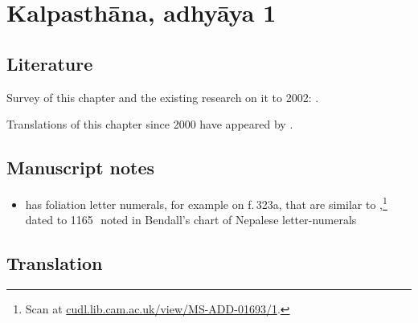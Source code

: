 \section{Kalpasthāna, adhyāya 1}

\subsection{Literature}

Survey of this chapter and the existing research 
on it to 2002: \cites[IA, 289--290]{meul-hist}.

Translations of this chapter since 2000 have appeared by 
\textcites[131--139]{wuja-2003}[3, 1--15]{shar-susr}.

\subsection{Manuscript notes}

\begin{itemize}
    \item {} has foliation letter numerals, for example on f.\,323a,
    that are similar to ,\footnote{Scan at 
    \href{https://cudl.lib.cam.ac.uk/view/MS-ADD-01693/1}{cudl.lib.cam.ac.uk/view/MS-ADD-01693/1}.}
     dated to 
    1165\,\CE\, noted in Bendall's 
    chart of Nepalese letter-numerals \cite[Lithograph V, after p.\,225]{bend-budd}
\end{itemize}

\newpage

\subsection{Translation}

